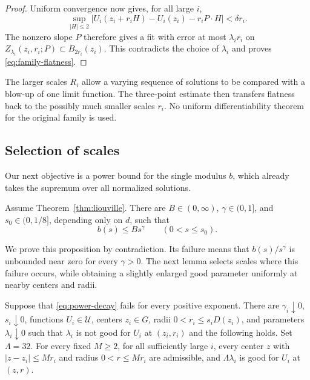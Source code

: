 \begin{proof}
Uniform convergence now gives, for all large $i$,
\[
  \sup_{|H|\le2}|U_i(z_i+r_iH)-U_i(z_i)-r_iP\cdot H|
       <\delta r_i.
\]
The nonzero slope $P$ therefore gives a fit with error at most $\lambda_i r_i$ on $Z_{\lambda_i}(z_i,r_i;P)\subset B_{2r_i}(z_i)$. This contradicts the choice of $\lambda_i$ and proves \eqref{eq:family-flatness}.
\end{proof}

The larger scales $R_i$ allow a varying sequence of solutions to be compared with a blow-up of one limit function. The three-point estimate then transfers flatness back to the possibly much smaller scales $r_i$. No uniform differentiability theorem for the original family is used.

\subsection{Selection of scales}

Our next objective is a power bound for the single modulus $b$, which already takes the supremum over all normalized solutions.

\begin{proposition}\label{prop:power-decay}
Assume Theorem~\ref{thm:liouville}. There are $B\in(0,\infty)$, $\gamma\in(0,1]$, and $s_0\in(0,1/8]$, depending only on $d$, such that
\begin{equation}\label{eq:power-decay}
  b(s)\le Bs^\gamma\qquad(0<s\le s_0).
\end{equation}
\end{proposition}

We prove this proposition by contradiction. Its failure means that $b(s)/s^\gamma$ is unbounded near zero for every $\gamma>0$. The next lemma selects scales where this failure occurs, while obtaining a slightly enlarged good parameter uniformly at nearby centers and radii.

\begin{lemma}\label{lem:bad-scales}
Suppose that \eqref{eq:power-decay} fails for every positive exponent. There are $\gamma_i\downarrow0$, $s_i\downarrow0$, functions $U_i\in\mathcal U$, centers $z_i\in G$, radii $0<r_i\le s_iD(z_i)$, and parameters $\lambda_i\downarrow0$ such that $\lambda_i$ is not good for $U_i$ at $(z_i,r_i)$ and the following holds. Set $\Lambda=32$. For every fixed $M\ge2$, for all sufficiently large $i$, every center $z$ with $|z-z_i|\le Mr_i$ and radius $0<r\le Mr_i$ are admissible, and $\Lambda\lambda_i$ is good for $U_i$ at $(z,r)$.
\end{lemma}

